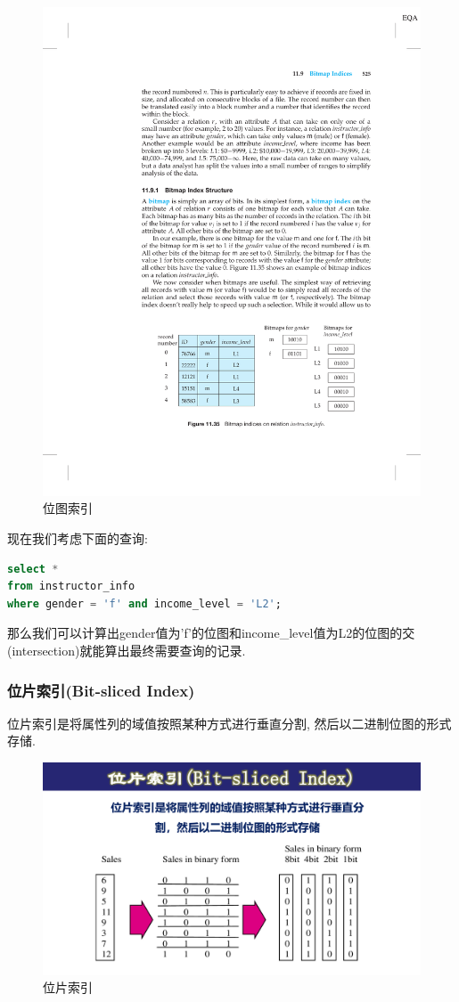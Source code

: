 \begin{figure}[H]
    \centering
    \includegraphics[width=.7\textwidth]{figure/位图索引.pdf}
    \caption{位图索引}
\end{figure}

现在我们考虑下面的查询:
\begin{lstlisting}[language=SQL]
select *
from instructor_info
where gender = 'f' and income_level = 'L2';
\end{lstlisting}

那么我们可以计算出gender值为'f'的位图和income\_level值为L2的位图的交(intersection)就能算出最终需要查询的记录.

\subsubsection{位片索引(Bit-sliced Index)}

位片索引是将属性列的域值按照某种方式进行垂直分割, 然后以二进制位图的形式存储.
\begin{figure}[H]
    \centering
    \includegraphics[width=.6\textwidth]{figure/位片索引.pdf}
    \caption{位片索引}
\end{figure}

